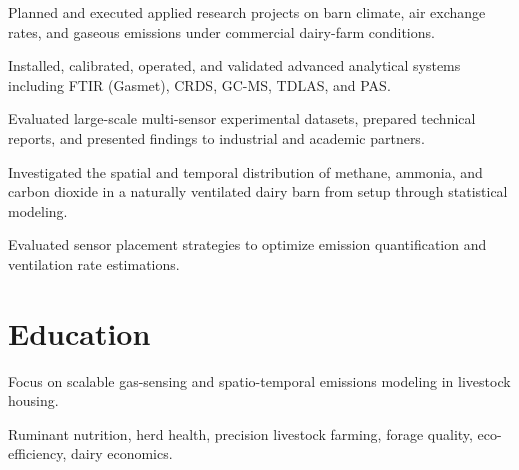 \documentclass[10pt,a4paper]{article}
\begin{document}
\begin{cvitems}

  \item Planned and executed applied research projects on barn climate, air exchange rates, and gaseous emissions under commercial dairy-farm conditions.

  \item Installed, calibrated, operated, and validated advanced analytical systems including FTIR (Gasmet), CRDS, GC-MS, TDLAS, and PAS.

  \item Evaluated large-scale multi-sensor experimental datasets, prepared technical reports, and presented findings to industrial and academic partners.

\end{cvitems}
\vspace{2pt}

\begin{cvitems}

  \item Investigated the spatial and temporal distribution of methane, ammonia, and carbon dioxide in a naturally ventilated dairy barn from setup through statistical modeling.

  \item Evaluated sensor placement strategies to optimize emission quantification and ventilation rate estimations.

\end{cvitems}
\vspace{2pt}


\section*{Education}


{\small Focus on scalable gas-sensing and spatio-temporal emissions modeling in livestock housing.}\par



{\small Ruminant nutrition, herd health, precision livestock farming, forage quality, eco-efficiency, dairy economics.}\par
\end{document}
